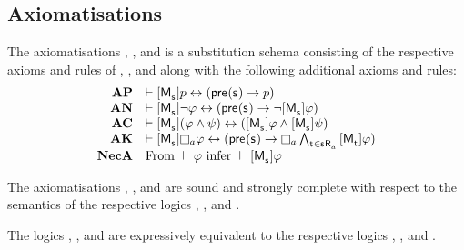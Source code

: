 

\subsection{Axiomatisations}

\begin{definition}
The axiomatisations \axiomAmlK{}, \axiomAmlKFF{}, and \axiomAmlS{} is a substitution schema consisting of the respective axioms and rules of \axiomK{}, \axiomKFF{}, and \axiomS{} along with the following additional axioms and rules:
$$
\begin{array}{rl}
    {\bf AP} & \proves \actionA{\pointedActionModel{\actionStateS}} \atomP \iff (\actionPrecondition(\actionStateS) \implies \atomP)\\
    {\bf AN} & \proves \actionA{\pointedActionModel{\actionStateS}} \lnot \phi \iff (\actionPrecondition(\actionStateS) \implies \lnot \actionA{\pointedActionModel{\actionStateS}} \phi)\\
    {\bf AC} & \proves \actionA{\pointedActionModel{\actionStateS}} (\phi \land \psi) \iff (\actionA{\pointedActionModel{\actionStateS}} \phi \land \actionA{\pointedActionModel{\actionStateS}} \psi)\\
    {\bf AK} & \proves \actionA{\pointedActionModel{\actionStateS}} \necessary[\agentA] \phi \iff (\actionPrecondition(\actionStateS) \implies \necessary[\agentA] \bigwedge_{\actionStateT \in \actionSuccessors{\agentA}{\actionStateS}} \actionA{\pointedActionModel{\actionStateT}} \phi)\\
    {\bf NecA} & \text{From } \proves \phi \text{ infer } \proves \actionA{\pointedActionModel{\actionStateS}} \phi
\end{array}
$$
\end{definition}

\begin{proposition}
The axiomatisations \axiomAmlK{}, \axiomAmlKFF{}, and \axiomAmlS{} are sound and strongly complete with respect to the semantics of the respective logics \logicAmlK{}, \logicAmlKFF{}, and \logicAmlS{}.
\end{proposition}

\begin{proposition}
The logics \logicAmlK{}, \logicAmlKFF{}, and \logicAmlS{} are expressively equivalent to the respective logics \logicK{}, \logicKFF{}, and \logicS{}.
\end{proposition}
